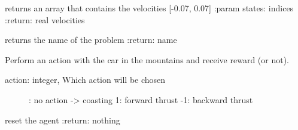 \documentclass[letterpaper,10pt,english]{sphinxmanual}
\begin{document}
\begin{fulllineitems}

\begin{fulllineitems}
\label{Problems:morl_problems.MountainCar.get_velocities}
returns an array that contains the velocities {[}-0.07, 0.07{]}
:param states: indices
:return: real   velocities

\end{fulllineitems}


\begin{fulllineitems}
\label{Problems:morl_problems.MountainCar.name}
returns the name of the problem
:return: name

\end{fulllineitems}


\begin{fulllineitems}
\label{Problems:morl_problems.MountainCar.play}
Perform an action with the car in the mountains
and receive reward (or not).
\begin{description}
\item[{action: integer, Which action will be chosen}] : no action -\textgreater{} coasting
1: forward thrust
-1: backward thrust

\end{description}

\end{fulllineitems}


\begin{fulllineitems}
\label{Problems:morl_problems.MountainCar.reset}
reset the agent
:return: nothing

\end{fulllineitems}


\end{fulllineitems}

\end{document}
